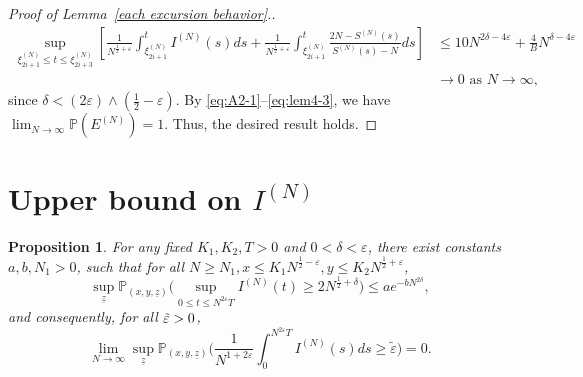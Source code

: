 \documentclass[11pt, reqno]{article}
\newtheorem{prop}[theorem]{Proposition}
\numberwithin{equation}{section}
\numberwithin{theorem}{section}
\begin{document}
\begin{appendix}
\begin{proof}[Proof of Lemma~\ref{each excursion behavior}.]
\begin{align*}
    \sup_{\xi^{(N)}_{2i+1}\leq t\leq \xi^{(N)}_{2i+3}}\left[\frac{1}{N^{\frac{1}{2}+\varepsilon}}\int_{\xi^{(N)}_{2i+1}}^t I^{(N)}(s)ds+\frac{1}{N^{\frac{1}{2}+\varepsilon}}\int_{\xi^{(N)}_{2i+1}}^t\frac{2N-S^{(N)}(s)}{S^{(N)}(s)-N}ds\right] &\leq 10 N^{2\delta-4\varepsilon}+\frac{4}{B}N^{\delta-4\varepsilon}\\
    &\rightarrow0\text{ as }N\rightarrow\infty,
\end{align*}
since $\delta<(2\varepsilon)\wedge(\frac{1}{2}-\varepsilon)$.
By \eqref{eq:A2-1}--\eqref{eq:lem4-3}, we have $\lim_{N\rightarrow\infty}\mathbb{P}(E^{(N)})=1$.  Thus, the desired result holds.
\end{proof}



\section{Upper bound on $I^{(N)}$}
\begin{prop}\label{prop:upper-bound-I}
For any fixed $K_1, K_2,T>0$ and $0<\delta<\varepsilon$, there exist constants $a, b, N_1>0$,
 such that
for all $N\geq N_1, x\leq K_1N^{\frac{1}{2}-\varepsilon}, y\leq K_2 N^{\frac{1}{2}+\varepsilon}$,
$$ \sup_{\underline{z}} \mathbb{P}_{(x, y, \underline{z})}\Big(\sup_{0\leq t\leq N^{2\varepsilon}T}I^{(N)}(t)\geq 2N^{\frac{1}{2}+\delta}\Big)\leq a e^{-b N^{2\delta}},$$
and consequently, for all $ \Tilde{\varepsilon}>0$,
\begin{equation}\label{eq:idle-integral-2}
    \lim_{N\rightarrow\infty}
    \sup_{\underline{z}} \mathbb{P}_{(x, y, \underline{z})}\Big(\frac{1}{N^{1+2\varepsilon}}\int_0^{N^{2\varepsilon}T} I^{(N)}(s)ds\geq \tilde{\varepsilon}\Big)=0.
\end{equation}
\end{prop}


\end{appendix}
\end{document}

